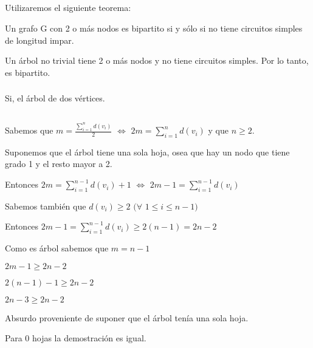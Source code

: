 \subsection{}
\subsubsection{}

Utilizaremos el siguiente teorema: 

Un grafo G con 2 o más nodos es bipartito si y sólo si no tiene circuitos simples de longitud impar.

Un árbol no trivial tiene 2 o más nodos y no tiene circuitos simples. Por lo tanto, es bipartito.

\subsubsection{}

Si, el árbol de dos vértices.

\setcounter{subsection}{4}
\subsection{}

Sabemos que $m = \frac{\sum_{i = 1}^{n}d(v_i)}{2}$ $\Longleftrightarrow$ $2m = \sum_{i = 1}^{n}d(v_i)$ y que $n \geq 2$.

Suponemos que el árbol tiene una sola hoja, osea que hay un nodo que tiene grado 1 y el resto mayor a 2.

Entonces $2m = \sum_{i = 1}^{n - 1}d(v_i) + 1$ $\Longleftrightarrow$ $2m - 1= \sum_{i = 1}^{n - 1}d(v_i)$

Sabemos también que  $d(v_i) \geq 2$ $(\forall$ $1 \leq i \leq n - 1)$

Entonces $2m - 1= \sum_{i = 1}^{n - 1}d(v_i) \geq 2(n - 1) = 2n - 2$

Como es árbol sabemos que $m = n - 1$

$2m - 1 \geq 2n - 2$

$2(n - 1) - 1 \geq 2n - 2$

$2n - 3 \geq 2n - 2$

Absurdo proveniente de suponer que el árbol tenía una sola hoja.

Para 0 hojas la demostración es igual.

\subsection{}

